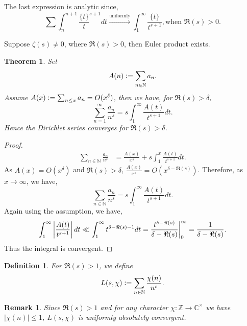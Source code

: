 \documentclass{article}
\newtheorem{theorem}{Theorem} [section]
\newtheorem{definition}{Definition}[section]
\newtheorem{remark}{Remark}[section]
\newcommand{\defeq}{\vcentcolon=}
\newcommand{\N}[0]{\mathbb{N}}
\newcommand{\Z}[0]{\mathbb{Z}}
\newcommand{\C}[0]{\mathbb{C}}
\begin{document}
The last expression is analytic since,
\begin{equation*}
  \sum\int_n^{n+1}{\frac {\{t\}} t^{s+1}}dt \stackrel{\text{uniformly}}{\to}\int_1^\infty{\frac {\{t\}} {t^{s+1}}}, \text{when $\Re(s)>0$}.
\end{equation*}

Suppose $\zeta(s)\not=0$, where $\Re(s)>0$, then Euler product exists. 
\begin{theorem}
  \label{theorem_dirichlet_integral}
  Set 
  \begin{equation*}
    A(n)\defeq\sum_{n\in\N}a_n.
  \end{equation*}
  Assume $A(x)\defeq\sum_{n\leq x}a_n=O(x^\delta)$, then we have, for $\Re(s)>\delta$,
  \begin{equation*}
    \sum_{n=1}^\infty {\frac {a_n} {n^s}} = s\int_1^\infty {\frac {A(t)} {t^{s+1}}}dt.
  \end{equation*}
  Hence the Dirichlet series converges for $\Re(s)>\delta$.
\end{theorem}
\begin{proof}
  \begin{align*}
    \sum_{n\in\N}{\frac {a_n} {n^s}} & = {\frac {A(x)} {x^s}}+s\int_1^x{\frac {A(t)} {t^{s+1}}}dt.
  \end{align*}
  As $A(x) = O(x^\delta)$ and $\Re(s)>\delta$, ${\frac {A(x)} {x^s}} = O(x^{\delta-\Re(s)})$. Therefore, as $x\to\infty$, we have,
  \begin{equation*}
    \sum_{n\in\N}{\frac {a_n} {n^s}} = s\int_1^\infty {\frac {A(t)} {t^{s+1}}}dt.
  \end{equation*}
  Again using the assumption, we have,
  \begin{equation*}
    \int_1^\infty \left\vert{\frac {A(t)} {t^{s+1}}}\right\vert dt\ll \int_1^\infty t^{\delta-\Re(s)-1}dt = {\frac {t^{\delta-\Re(s)}} {\delta-\Re(s)}}\bigg{|}_0^\infty = {\frac 1 {\delta-\Re(s)}}.
  \end{equation*}
  Thus the integral is convergent.
\end{proof}

\begin{definition}
  For $\Re(s)>1$, we define
  \begin{equation*}
    L(s,\chi)\defeq \sum_{n\in\N} {\frac {\chi(n)} {n^s}}.
  \end{equation*}
\end{definition}

\begin{remark}
  Since $\Re(s)>1$ and for any character $\chi:\Z\to\C^\times$ we have $\vert\chi(n)\vert\leq 1$, $L(s,\chi)$ is uniformly absolutely convergent.
\end{remark}
\end{document}
